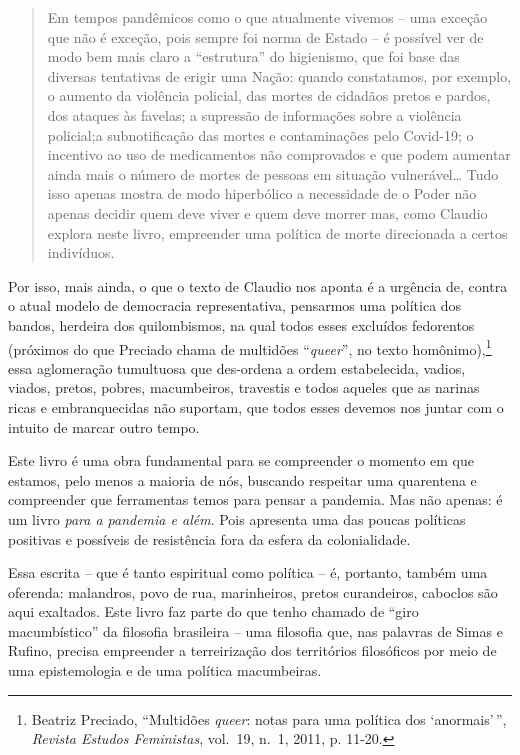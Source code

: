 \begin{quote}
Em tempos pandêmicos como o que atualmente vivemos -- uma exceção que
não é exceção, pois sempre foi norma de Estado -- é possível ver de modo
bem mais claro a ``estrutura'' do higienismo, que foi base das diversas
tentativas de erigir uma Nação: quando constatamos, por exemplo, o
aumento da violência policial, das mortes de cidadãos pretos e pardos,
dos ataques às favelas; a supressão de informações sobre a violência
policial;a subnotificação das mortes e contaminações pelo Covid-19; o
incentivo ao uso de medicamentos não comprovados e que podem aumentar
ainda mais o número de mortes de pessoas em situação vulnerável\ldots{}
Tudo isso apenas mostra de modo hiperbólico a necessidade de o Poder não
apenas decidir quem deve viver e quem deve morrer mas, como Claudio
explora neste livro, empreender uma política de morte direcionada a
certos indivíduos.
\end{quote}

Por isso, mais ainda, o que o texto de Claudio nos aponta é a urgência
de, contra o atual modelo de democracia representativa, pensarmos uma
política dos bandos, herdeira dos quilombismos, na qual todos esses
excluídos fedorentos (próximos do que Preciado chama de multidões
``\emph{queer}'', no texto homônimo),\footnote{Beatriz Preciado,
  ``Multidões \emph{queer}: notas para uma política dos `anormais'\,'',
  \emph{Revista Estudos Feministas}, vol.~19, n.~1, 2011, p. 11-20.}
essa aglomeração tumultuosa que des-ordena a ordem estabelecida, vadios,
viados, pretos, pobres, macumbeiros, travestis e todos aqueles que as
narinas ricas e embranquecidas não suportam, que todos esses devemos nos
juntar com o intuito de marcar outro tempo.

Este livro é uma obra fundamental para se compreender o momento em que
estamos, pelo menos a maioria de nós, buscando respeitar uma quarentena
e compreender que ferramentas temos para pensar a pandemia. Mas não
apenas: é um livro \emph{para a pandemia e além}. Pois apresenta uma das
poucas políticas positivas e possíveis de resistência fora da esfera da
colonialidade.

Essa escrita -- que é tanto espiritual como política -- é, portanto,
também uma oferenda: malandros, povo de rua, marinheiros, pretos
curandeiros, caboclos são aqui exaltados. Este livro faz parte do que
tenho chamado de ``giro macumbístico'' da filosofia brasileira -- uma
filosofia que, nas palavras de Simas e Rufino, precisa empreender a
terreirização dos territórios filosóficos por meio de uma epistemologia
e de uma política macumbeiras.

